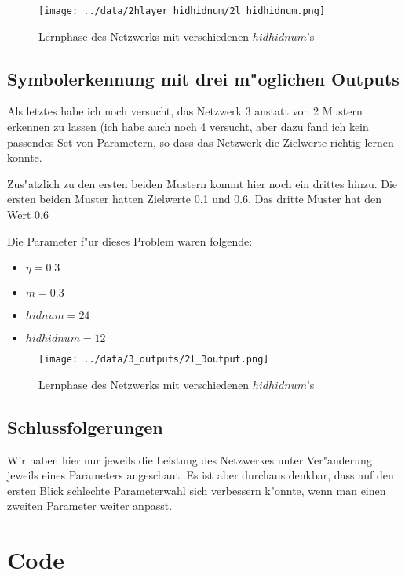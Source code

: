 \documentclass[10pt]{article}
\begin{document}
\begin{figure}[h!]
\centering
\texttt{[image: ../data/2hlayer\_hidhidnum/2l\_hidhidnum.png]}
\caption{Lernphase des Netzwerks mit verschiedenen $hidhidnum$'s}
\end{figure}
\subsection{Symbolerkennung mit drei m"oglichen Outputs}
Als letztes habe ich noch versucht, das Netzwerk 3 anstatt von 2 Mustern erkennen zu lassen (ich habe auch noch 4 versucht, aber dazu fand ich kein passendes Set von Parametern, so dass das Netzwerk die Zielwerte richtig lernen konnte.

Zus"atzlich zu den ersten beiden Mustern kommt hier noch ein drittes hinzu. Die ersten beiden Muster hatten Zielwerte 0.1 und 0.6. Das dritte Muster hat den Wert 0.6

Die Parameter f"ur dieses Problem waren folgende:
\begin{itemize}
\item $\eta = 0.3$
\item $m = 0.3$
\item $hidnum = 24$
\item $hidhidnum = 12$
\end{itemize}
\begin{figure}[h!]
\centering
\texttt{[image: ../data/3\_outputs/2l\_3output.png]}
\caption{Lernphase des Netzwerks mit verschiedenen $hidhidnum$'s}
\end{figure}

\subsection{Schlussfolgerungen}

Wir haben hier nur jeweils die Leistung des Netzwerkes unter Ver"anderung jeweils eines Parameters angeschaut. Es ist aber durchaus denkbar, dass auf den ersten Blick schlechte Parameterwahl sich verbessern k"onnte, wenn man einen zweiten Parameter weiter anpasst.

\clearpage
\section{Code}
\end{document}
